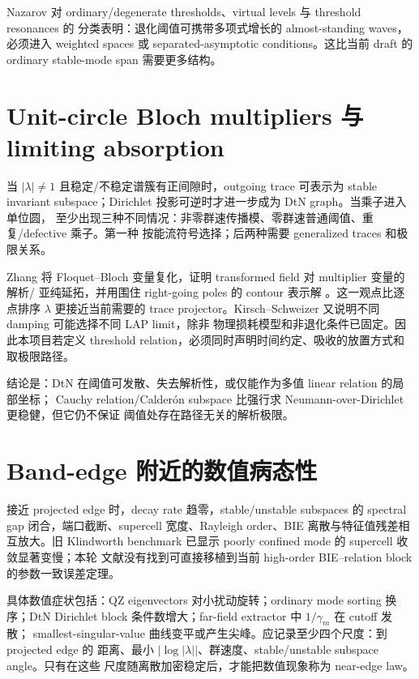 \documentclass[UTF8,11pt,fontset=none]{ctexart}
\begin{document}
Nazarov 对 ordinary/degenerate thresholds、virtual levels 与 threshold resonances 的
分类表明：退化阈值可携带多项式增长的 almost-standing waves，必须进入 weighted spaces
或 separated-asymptotic conditions\cite{Nazarov2020Threshold}。这比当前 draft 的
ordinary stable-mode span 需要更多结构。

\section{Unit-circle Bloch multipliers 与 limiting absorption}

当 \(|\lambda|\neq1\) 且稳定/不稳定谱簇有正间隙时，outgoing trace 可表示为 stable
invariant subspace；Dirichlet 投影可逆时才进一步成为 DtN graph。当乘子进入单位圆，
至少出现三种不同情况：非零群速传播模、零群速普通阈值、重复/defective 乘子。第一种
按能流符号选择；后两种需要 generalized traces 和极限关系。

Zhang 将 Floquet--Bloch 变量复化，证明 transformed field 对 multiplier 变量的解析/
亚纯延拓，并用围住 right-going poles 的 contour 表示解
\cite{Zhang2021NumericalWaveguides}。这一观点比逐点排序 \(\lambda\) 更接近当前需要的
trace projector。Kirsch--Schweizer 又说明不同 damping 可能选择不同 LAP limit，除非
物理损耗模型和非退化条件已固定\cite{KirschSchweizer2025}。因此本项目若定义 threshold
relation，必须同时声明时间约定、吸收的放置方式和取极限路径。

结论是：DtN 在阈值可发散、失去解析性，或仅能作为多值 linear relation 的局部坐标；
Cauchy relation/Calderón subspace 比强行求 Neumann-over-Dirichlet 更稳健，但它仍不保证
阈值处存在路径无关的解析极限。

\section{Band-edge 附近的数值病态性}

接近 projected edge 时，decay rate 趋零，stable/unstable subspaces 的 spectral gap
闭合，端口截断、supercell 宽度、Rayleigh order、BIE 离散与特征值残差相互放大。旧
Klindworth benchmark 已显示 poorly confined mode 的 supercell 收敛显著变慢；本轮
文献没有找到可直接移植到当前 high-order BIE--relation block 的参数一致误差定理。

具体数值症状包括：QZ eigenvectors 对小扰动旋转；ordinary mode sorting 换序；DtN
Dirichlet block 条件数增大；far-field extractor 中 \(1/\gamma_m\) 在 cutoff 发散；
smallest-singular-value 曲线变平或产生尖峰。应记录至少四个尺度：到 projected edge 的
距离、最小 \(|\log|\lambda||\)、群速度、stable/unstable subspace angle。只有在这些
尺度随离散加密稳定后，才能把数值现象称为 near-edge law。
\end{document}
